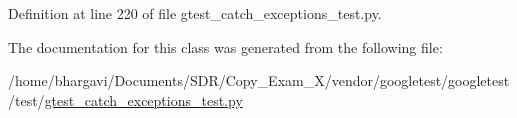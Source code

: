 Definition at line 220 of file gtest\+\_\+catch\+\_\+exceptions\+\_\+test.\+py.



The documentation for this class was generated from the following file\+:\begin{DoxyCompactItemize}
\item 
/home/bhargavi/\+Documents/\+S\+D\+R/\+Copy\+\_\+\+Exam\+\_\+X/vendor/googletest/googletest/test/\hyperlink{gtest__catch__exceptions__test_8py}{gtest\+\_\+catch\+\_\+exceptions\+\_\+test.\+py}\end{DoxyCompactItemize}
